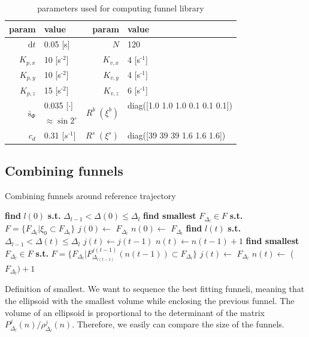 \documentclass[letterpaper, 10 pt, conference]{ieeeconf}  %
\begin{document}
\begin{table}[b]
\begin{center}
\begin{tabular}{|r|l||r|l|} 
\hline
param & value & param & value \\ \hline \hline
$\text{d}t$ & 0.05 [s] & $N$ & 120 \\ \hline
$K_{p,x}$ & 10 [s$^\text{-2}$] & $K_{v,x}$ & 4 [s$^\text{-1}$] \\ \hline
$K_{p,y}$ & 10 [s$^\text{-2}$] & $K_{v,y}$ & 4 [s$^\text{-1}$] \\ \hline
$K_{p,z}$ & 15 [s$^\text{-2}$] & $K_{v,z}$ & 6 [s$^\text{-1}$] \\ \hline
\multirow{2}{*}{$\bar{\text{s}}_\Phi$} & 0.035 [$\cdot$] & \multirow{2}{*}{$R^b\;(\xi^b)$} & diag([1.0 1.0 1.0 0.1 0.1 0.1]) \\ 
& $\approx\sin2^\circ$ & & \;\;\;\;\;\;\;\;\;\;\;\;\;\;\;\;\;\;\;\;\;\;\;\; \\ \hline
$c_d$ & 0.31 [$s^\text{-1}$]                         & $R^s\;(\xi^s)$ & diag([39 39 39 1.6 1.6 1.6]) \\ \hline
\end{tabular}
\caption{parameters used for computing funnel library} \label{table:settings} 
\end{center}
\end{table}

\subsection{Combining funnels}
\begin{algorithm}
  \caption{Combining funnels around reference trajectory
    \label{alg:funnel}}
  \begin{algorithmic}[1]
    \Statex
	\State \textbf{find }$l(0)$\textbf{ s.t.} $\Delta_{l-1} < \Delta(0) \leq \Delta_l$ 
	\State \textbf{find smallest} $F_{\Delta_l} \in {F}$ \textbf{s.t.} ${F}=\{F_{\Delta_l}|\xi_0 \subset F_{\Delta_l}\}$
\State $j(0) \gets $ $F_{\Delta_l}$
\State $n(0) \gets $ $F_{\Delta_l}$
				\State \textbf{find }$l(t)$\textbf{ s.t. }$\Delta_{l-1} < \Delta(t) \leq \Delta_l$
				\State $j(t) \gets j(t-1)$ 
				\State $n(t) \gets n(t-1)+1$
				\Else
				\State \textbf{find smallest} $F_{\Delta_l} \in {F}$ \textbf{s.t.} 
				\State ${F}=\{F_{\Delta_l}|F_{\Delta_{l(t-1)}}^{j(t-1)}(n(t-1)) \subset F_{\Delta_l}\}$
				\State $j(t) \gets$ $F_{\Delta_l}$ 
				\State $n(t) \gets$ ($F_{\Delta_l}) + 1$
				\EndIf
      \EndFor
      \State {}
    \EndFunction
  \end{algorithmic}
\end{algorithm}
Definition of smallest. 
We want to sequence the best fitting funneli, meaning that the ellipsoid with the smallest volume while enclosing the previous funnel.
The volume of an ellipsoid is proportional to the determinant of the matrix $P_{\Delta_l}^j(n)/\rho_{\Delta_l}^j(n)$.
Therefore, we easily can compare the size of the funnels.
\end{document}
